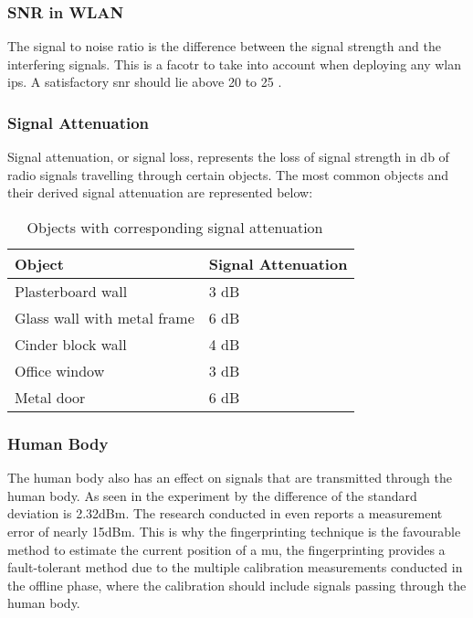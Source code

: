 \subsubsection{SNR in WLAN}
The signal to noise ratio is the difference between the signal strength and the interfering signals. This is a facotr to take into account when deploying any \acrshort{wlan} \acrlong{ips}. A satisfactory \acrlong{snr} should lie above 20 to 25 \cite{Hallock2015}.
\subsubsection{Signal Attenuation}
Signal attenuation, or signal loss, represents the loss of signal strength in \acrfull{db} of radio signals travelling through certain objects. The most common objects and their derived signal attenuation are represented below:
\begin{table}[]
\centering
\begin{tabular}{|l|l|}
\hline
\textbf{Object}             & \textbf{Signal Attenuation} \\ \hline
Plasterboard wall           & 3 dB                        \\ \hline
Glass wall with metal frame & 6 dB                        \\ \hline
Cinder block wall           & 4 dB                        \\ \hline
Office window               & 3 dB                        \\ \hline
Metal door                  & 6 dB                        \\ \hline
\end{tabular}
\caption{Objects with corresponding signal attenuation ~\cite[p.99]{Hallock2015}}
\end{table}
\subsubsection{Human Body}
The human body also has an effect on signals that are transmitted through the human body. As seen in the experiment by \cite{S2016} the difference of the standard deviation is 2.32dBm. The research conducted in \cite{Mautz} even reports a measurement error of nearly 15dBm.
This is why the fingerprinting technique is the favourable method to estimate the current position of a \acrlong{mu}, the fingerprinting provides a fault-tolerant method due to the multiple calibration measurements conducted in the offline phase, where the calibration should include signals passing through the human body.
